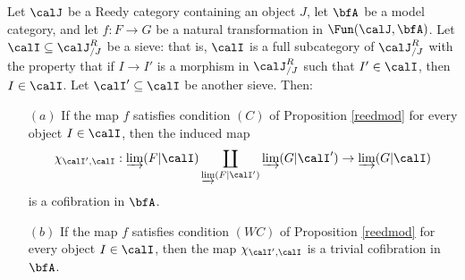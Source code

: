 \begin{Model Categories}
\begin{Didn't Read}
\begin{lemma}\label{jackal}
Let $\calJ$ be a Reedy category containing an object $J$, let $\bfA$ be a model category, and let $f: F \rightarrow G$ be a natural transformation in $\Fun(\calJ, \bfA)$.
Let $\calI \subseteq \calJ^{R}_{/J}$ be a sieve: that is, $\calI$ is a full subcategory
of $\calJ^{R}_{/J}$ with the property that if $I \rightarrow I'$ is a morphism in
$\calJ^{R}_{/J}$ such that $I' \in \calI$, then $I \in \calI$. Let $\calI' \subseteq \calI$ be another sieve. Then:
\begin{itemize}
\item[$(a)$] If the map $f$ satisfies condition $(C)$ of Proposition \ref{reedmod} for every object $I \in \calI$, then
the induced map
$$ \chi_{\calI', \calI}: \varinjlim( F | \calI) \coprod_{ \varinjlim(F | \calI') } \varinjlim( G | \calI')
\rightarrow \varinjlim( G | \calI )$$
is a cofibration in $\bfA$.
\item[$(b)$] If the map $f$ satisfies condition $(WC)$ of Proposition \ref{reedmod} for every object $I \in \calI$, then the map $\chi_{\calI', \calI}$ is a trivial cofibration in $\bfA$.
\end{itemize}
\end{lemma}


\end{Didn't Read}
\end{Model Categories}
